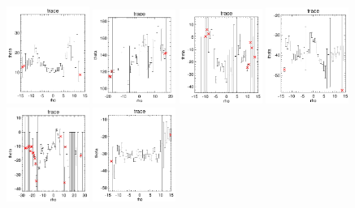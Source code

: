 \documentclass[fleqn,usenatbib]{mnras}
\begin{document}
\begin{figure}
    \includegraphics[width=0.24\textwidth]{Images/trace-plots/trace-plots-cpsb-controls/8442-3704.png}
    \includegraphics[width=0.24\textwidth]{Images/trace-plots/trace-plots-cpsb-controls/8461-9102.png}
    \includegraphics[width=0.24\textwidth]{Images/trace-plots/trace-plots-cpsb-controls/8602-6101.png}
    \includegraphics[width=0.24\textwidth]{Images/trace-plots/trace-plots-cpsb-controls/8623-3702.png}
    \includegraphics[width=0.24\textwidth]{Images/trace-plots/trace-plots-cpsb-controls/8624-12704.png}
    \includegraphics[width=0.24\textwidth]{Images/trace-plots/trace-plots-cpsb-controls/8625-3703.png}

\end{figure}
\end{document}

